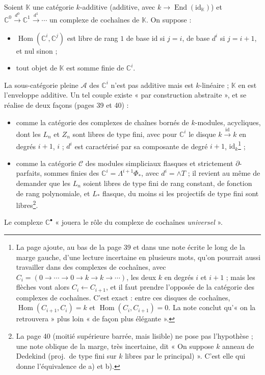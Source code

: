 \documentclass[11pt,a4paper]{article}
\begin{document}
Soient $\mathbb{K}$ une catégorie $k$-additive (additive, avec
$k \to \operatorname{End}(\mathrm{id}_{\mathbb{K}})$) et
$\mathbb{C}^{0} \xrightarrow{d^{0}} \mathbb{C}^{1} \xrightarrow{d^{1}}
\cdots$ un complexe de cochaînes de $\mathbb{K}$. On suppose :
\begin{itemize}
\item[a)] $\operatorname{Hom}(\mathbb{C}^{i}, \mathbb{C}^{j})$ est libre de
rang $1$ de base $\mathrm{id}$ si $j = i$, de base $d^{i}$ si $j = i+1$, et
nul sinon ;
\item[b)] tout objet de $\mathbb{K}$ est somme finie de $\mathbb{C}^{i}$.
\end{itemize}
La sous-catégorie pleine $\mathcal{A}$ des $\mathbb{C}^{i}$ n'est pas
additive mais est $k$-linéaire ; $\mathbb{K}$ en est l'enveloppe additive.
Un tel couple existe « par construction abstraite », et se réalise de deux
façons (pages 39 et 40) :
\begin{itemize}
\item comme la catégorie des complexes de chaînes bornés de $k$-modules,
acycliques, dont les $L_{n}$ et $Z_{n}$ sont libres de type fini, avec pour
$\mathbb{C}^{i}$ le disque $k \xrightarrow{\mathrm{id}} k$ en degrés $i+1$,
$i$ ; $d^{i}$ est caractérisé par sa composante de degré $i+1$,
$\mathrm{id}_{k}$\footnote{La page ajoute, au bas de la page 39 et dans une note
écrite le long de la marge gauche, d'une lecture incertaine en plusieurs mots,
qu'on pourrait aussi travailler dans des complexes de cochaînes, avec $C_{i} =
(0 \to \cdots \to 0 \to k \to k \to \cdots)$, les deux $k$ en degrés $i$
et $i+1$ ; mais les flèches vont alors $C_{i} \leftarrow C_{i+1}$, et il faut
prendre l'opposée de la catégorie des complexes de cochaînes. C'est exact :
entre ces disques de cochaînes, $\operatorname{Hom}(C_{i+1}, C_{i}) = k$ et
$\operatorname{Hom}(C_{i}, C_{i+1}) = 0$. La note conclut qu'« on la
retrouvera » plus loin « de façon plus élégante ».} ;
\item comme la catégorie $\mathcal{C}$ des modules simpliciaux flasques et
strictement $\partial$-parfaits, sommes finies des $\mathbb{C}^{i} =
\Lambda^{i+1}\Phi_{*}$, avec $d^{i} = \wedge T$ ; il revient au même de
demander que les $L_{n}$ soient libres de type fini de rang constant, de
fonction de rang polynomiale, et $L_{*}$ flasque, du moins si les
projectifs de type fini sont libres\footnote{La page 40 (moitié supérieure
barrée, mais lisible) ne pose pas l'hypothèse ; une note oblique de la marge,
très incertaine, dit « On suppose $k$ anneau de Dedekind (proj.\ de type
fini sur $k$ libres par le principal) ». C'est elle qui donne
l'équivalence de a) et b).}.
\end{itemize}
Le complexe $\mathbb{C}^{\bullet}$ « jouera le rôle du complexe de cochaînes
\emph{universel} ».
\end{document}
